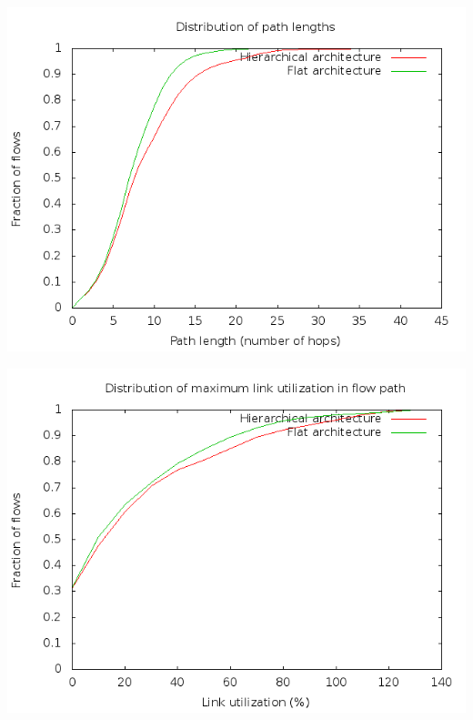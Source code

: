 \documentclass[portrait,a1paper,fontscale=0.5]{baposter} %
\begin{document}
\begin{poster}
{\begin{minipage}{.5\textwidth}
\begin{center}
\includegraphics[scale=0.3]{path.png}
\label{fig:path}
\end{center}
\end{minipage}

\begin{minipage}{.5\textwidth}
\begin{center}
\includegraphics[scale=0.3]{util.png}
\label{fig:util}
\end{center}
\end{minipage}


}
\end{poster}
\end{document}
